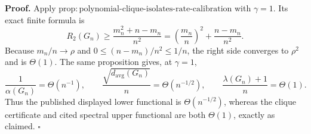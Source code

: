 \textbf{Proof.}
Apply \(\mathrm{prop{:}polynomial\text{-}clique\text{-}isolates\text{-}rate\text{-}calibration}\) with \(\gamma=1\).  Its exact finite formula is
\[
R_2(G_n)\geq\frac{m_n^2+n-m_n}{n^2}
=\left(\frac{m_n}{n}\right)^2+\frac{n-m_n}{n^2}.
\]
Because \(m_n/n\to\rho\) and \(0\leq(n-m_n)/n^2\leq1/n\), the right side converges to \(\rho^2\) and is \(\Theta(1)\).  The same proposition gives, at \(\gamma=1\),
\[
\frac1{\alpha(G_n)}=\Theta(n^{-1}),
\qquad
\frac{\sqrt{d_{\mathrm{avg}}(G_n)}}n=\Theta(n^{-1/2}),
\qquad
\frac{\lambda(G_n)+1}{n}=\Theta(1).
\]
Thus the published displayed lower functional is \(\Theta(n^{-1/2})\), whereas the clique certificate and cited spectral upper functional are both \(\Theta(1)\), exactly as claimed. \(\square\)